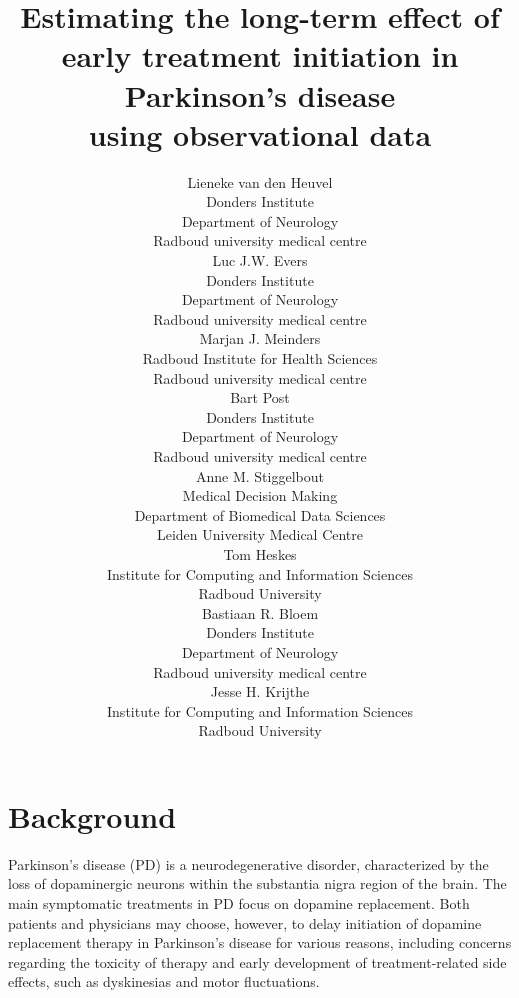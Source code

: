 \documentclass[final]{article}
\title{Estimating the long-term effect of\\ early treatment initiation in Parkinson's disease\\using observational data}
\author{%
  Lieneke van den Heuvel\\
  Donders Institute\\
  Department of Neurology\\
  Radboud university medical centre\\
  \And
  Luc J.W. Evers\\
  Donders Institute\\
  Department of Neurology\\
  Radboud university medical centre\\
  \And
  Marjan J. Meinders\\
  Radboud Institute for Health Sciences\\
  Radboud university medical centre\\
  \And
  Bart Post\\
   Donders Institute\\
  Department of Neurology\\
  Radboud university medical centre\\
  \And 
  Anne M. Stiggelbout\\
  Medical Decision Making\\
  Department of Biomedical Data Sciences\\
  Leiden University Medical Centre\\
  \And
  Tom Heskes\\
   Institute for Computing and Information Sciences\\
   Radboud University\\
  \And
   Bastiaan R. Bloem\\
      Donders Institute\\
  Department of Neurology\\
  Radboud university medical centre\\
   \And
   Jesse H. Krijthe\\
   Institute for Computing and Information Sciences\\
   Radboud University\\
}
\begin{document}
\maketitle



\section*{Background}
Parkinson's disease (PD) is a neurodegenerative disorder, characterized by the loss of dopaminergic neurons within the substantia nigra region of the brain. The main symptomatic treatments in PD focus on dopamine replacement. Both patients and physicians may choose, however, to delay initiation of dopamine replacement therapy in Parkinson's disease for various reasons, including concerns regarding the toxicity of therapy and early development of treatment-related side effects, such as dyskinesias and motor fluctuations. 
\end{document}
